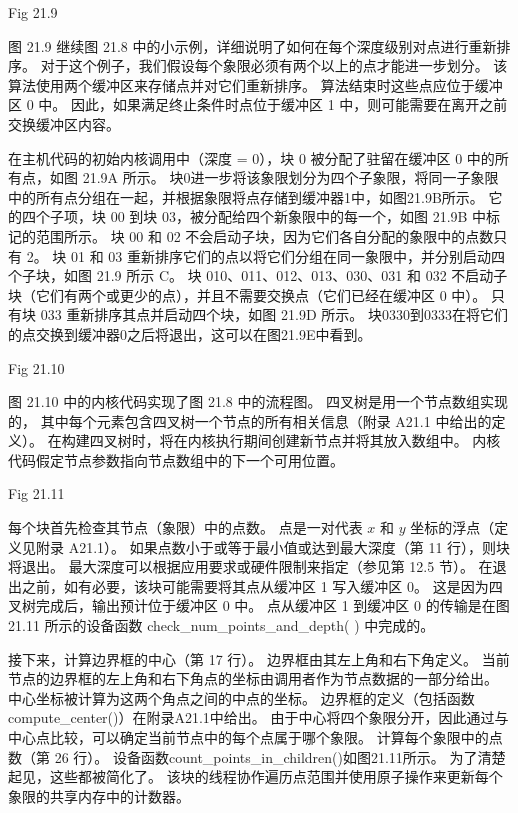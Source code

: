 {\color{red} Fig 21.9}

图 21.9 继续图 21.8 中的小示例，详细说明了如何在每个深度级别对点进行重新排序。 
对于这个例子，我们假设每个象限必须有两个以上的点才能进一步划分。 该算法使用两个缓冲区来存储点并对它们重新排序。 
算法结束时这些点应位于缓冲区 0 中。 因此，如果满足终止条件时点位于缓冲区 1 中，则可能需要在离开之前交换缓冲区内容。

在主机代码的初始内核调用中（深度 = 0），块 0 被分配了驻留在缓冲区 0 中的所有点，如图 21.9A 所示。 
块0进一步将该象限划分为四个子象限，将同一子象限中的所有点分组在一起，并根据象限将点存储到缓冲器1中，如图21.9B所示。 
它的四个子项，块 00 到块 03，被分配给四个新象限中的每一个，如图 21.9B 中标记的范围所示。 
块 00 和 02 不会启动子块，因为它们各自分配的象限中的点数只有 2。
块 01 和 03 重新排序它们的点以将它们分组在同一象限中，并分别启动四个子块，如图 21.9 所示 C。 
块 010、011、012、013、030、031 和 032 不启动子块（它们有两个或更少的点），并且不需要交换点（它们已经在缓冲区 0 中）。 
只有块 033 重新排序其点并启动四个块，如图 21.9D 所示。 
块0330到0333在将它们的点交换到缓冲器0之后将退出，这可以在图21.9E中看到。

{\color{red} Fig 21.10}

图 21.10 中的内核代码实现了图 21.8 中的流程图。 四叉树是用一个节点数组实现的，
其中每个元素包含四叉树一个节点的所有相关信息（附录 A21.1 中给出的定义）。 
在构建四叉树时，将在内核执行期间创建新节点并将其放入数组中。 内核代码假定节点参数指向节点数组中的下一个可用位置。

{\color{red} Fig 21.11}

每个块首先检查其节点（象限）中的点数。 点是一对代表 $x$ 和 $y$ 坐标的浮点（定义见附录 A21.1）。 
如果点数小于或等于最小值或达到最大深度（第 11 行），则块将退出。 
最大深度可以根据应用要求或硬件限制来指定（参见第 12.5 节）。 
在退出之前，如有必要，该块可能需要将其点从缓冲区 1 写入缓冲区 0。 
这是因为四叉树完成后，输出预计位于缓冲区 0 中。 
点从缓冲区 1 到缓冲区 0 的传输是在图 21.11 所示的设备函数 check\_num\_points\_and\_depth( ) 中完成的。

接下来，计算边界框的中心（第 17 行）。 边界框由其左上角和右下角定义。 
当前节点的边界框的左上角和右下角点的坐标由调用者作为节点数据的一部分给出。 中心坐标被计算为这两个角点之间的中点的坐标。 
边界框的定义（包括函数compute\_center()）在附录A21.1中给出。 
由于中心将四个象限分开，因此通过与中心点比较，可以确定当前节点中的每个点属于哪个象限。 计算每个象限中的点数（第 26 行）。 
设备函数count\_points\_in\_children()如图21.11所示。 为了清楚起见，这些都被简化了。 
该块的线程协作遍历点范围并使用原子操作来更新每个象限的共享内存中的计数器。

